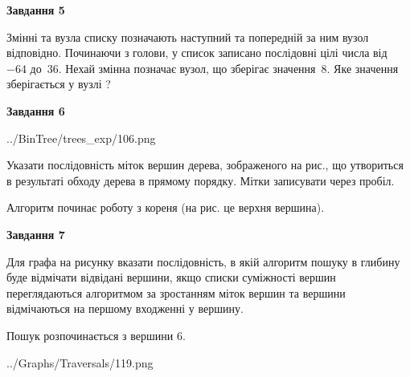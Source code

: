 \documentclass[12pt, ukrainian]{article}
\begin{document}
{\begin {large}
{\begin {center}\textbf{Завдання 5}\end {center}}\par
Змінні  та  вузла списку позначають наступний та попередній за ним вузол відповідно. Починаючи з голови, у список записано послідовні цілі числа від~$-64$ до~$36$. Нехай змінна  позначає вузол, що зберігає значення~$8$.
Яке значення зберігається у вузлі  ?\par
\newpage

{\begin {center}\textbf{Завдання 6}\end {center}}\par

\begin{center}
	{../BinTree/trees_exp/106.png}
\end{center}
Указати послідовність міток вершин дерева, зображеного на рис., що утвориться в результаті обходу дерева в прямому порядку. Мітки записувати через пробіл.\par Алгоритм починає роботу з кореня (на рис. це верхня вершина).\par
\newpage

{\begin {center}\textbf{Завдання 7}\end {center}}\par
Для графа на рисунку вказати послідовність, в якій алгоритм пошуку в глибину буде відмічати відвідані вершини, якщо списки суміжності вершин переглядаються алгоритмом за зростанням міток вершин та вершини відмічаються на першому вход\-женні у вершину.\par
Пошук розпочинається з вершини 6.\par

\begin{center}
	{../Graphs/Traversals/119.png}
\end{center}\par
\newpage


\end{large}}
\end{document}
